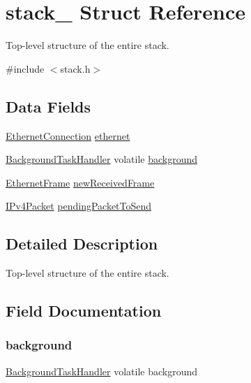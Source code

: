 \hypertarget{structstack__}{}\section{stack\+\_\+ Struct Reference}
\label{structstack__}


Top-\/level structure of the entire stack.  




{\ttfamily \#include $<$stack.\+h$>$}

\subsection*{Data Fields}
\begin{DoxyCompactItemize}
\item 
\mbox{\hyperlink{ethernet_types_8h_a2c48d64c5a0d0371a4fe5aed16f234a4}{Ethernet\+Connection}} \mbox{\hyperlink{structstack___ab2e5d6951e766b96b9efe5540f4bd857}{ethernet}}
\item 
\mbox{\hyperlink{group__background_gad47b3415c13ac85eb0e878091441c53f}{Background\+Task\+Handler}} volatile \mbox{\hyperlink{structstack___ad0af9bf2d27328ff7a3c7c253759ede7}{background}}
\item 
\mbox{\hyperlink{ethernet_types_8h_a4326bd21ae707ac8b03ec375370e3b5b}{Ethernet\+Frame}} \mbox{\hyperlink{structstack___acce4d7d9a581bdc9e2d7f6baafc4915f}{new\+Received\+Frame}}
\item 
\mbox{\hyperlink{group__ipv4_gae8c714b7e0ba099c47c42d77b46407f5}{I\+Pv4\+Packet}} \mbox{\hyperlink{structstack___a5b1fe5efc3ada8a585cde6c6b08dbb67}{pending\+Packet\+To\+Send}}
\end{DoxyCompactItemize}


\subsection{Detailed Description}
Top-\/level structure of the entire stack. 

\subsection{Field Documentation}
\mbox{\label{structstack___ad0af9bf2d27328ff7a3c7c253759ede7}} 
\subsubsection{\texorpdfstring{background}{background}}
{\footnotesize\ttfamily \mbox{\hyperlink{group__background_gad47b3415c13ac85eb0e878091441c53f}{Background\+Task\+Handler}} volatile background}

